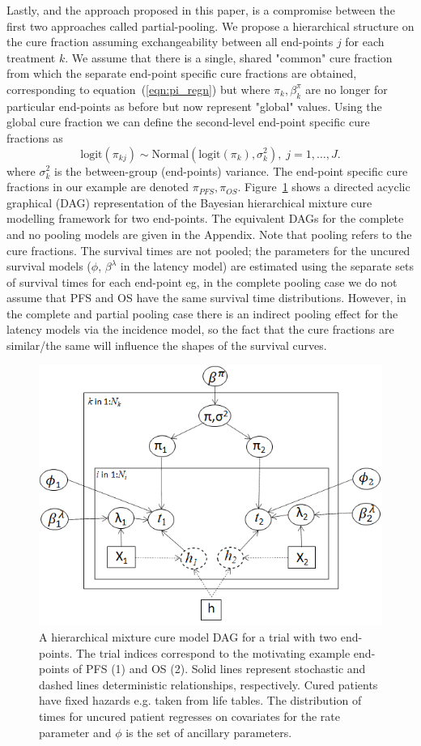 \documentclass[AMA,STIX1COL]{WileyNJD-v2}
\begin{document}
Lastly, and the approach proposed in this paper, is a compromise between the first two approaches called partial-pooling.
We propose a hierarchical structure on the cure fraction assuming exchangeability between all end-points $j$ for each treatment $k$.
We assume that there is a single, shared "common" cure fraction from which the separate end-point specific cure fractions are obtained, corresponding to equation~(\ref{eqn:pi_regn})
but where $\pi_{k}, \beta^{\pi}_{k}$ are no longer for particular end-points as before but now represent "global" values.
Using the global cure fraction we can define the second-level end-point specific cure fractions as
$$
\text{logit}(\pi_{kj}) \sim \text{Normal}(\text{logit}(\pi_k), \sigma_k^2), \; j = 1, \ldots, J.  
$$
where $\sigma_k^2$ is the between-group (end-points) variance.
The end-point specific cure fractions in our example are denoted $\pi_{PFS}, \pi_{OS}$.
Figure~\ref{fig:hier_dag} shows a directed acyclic graphical (DAG) representation of the Bayesian hierarchical mixture cure modelling framework for two end-points.
The equivalent DAGs for the complete and no pooling models are given in the Appendix.
Note that pooling refers to the cure fractions. The survival times are not pooled; the parameters for the uncured survival models ($\phi$, $\beta^{\lambda}$ in the latency model) are estimated using the separate sets of survival times for each end-point
eg, in the complete pooling case we do not assume that PFS and OS have the same survival time distributions.
However, in the complete and partial pooling case there is an indirect pooling effect for the latency models via the incidence model, so the fact that the cure fractions are similar/the same will influence the shapes of the survival curves.

\begin{figure}[!ht]
\centering
\includegraphics[width=0.6\linewidth]{DAG_with_Tx.png}
\caption{\label{fig:hier_dag} A hierarchical mixture cure model DAG for a trial with two end-points. The trial indices correspond to the motivating example end-points of PFS (1) and OS (2).
Solid lines represent stochastic and dashed lines deterministic relationships, respectively.
Cured patients have fixed hazards e.g. taken from life tables.
The distribution of times for uncured patient regresses on covariates for the rate parameter and $\phi$ is the set of ancillary parameters.}
\end{figure}
\end{document}
